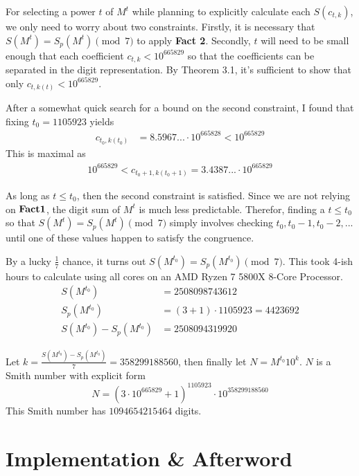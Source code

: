 \documentclass{amsart}
\newcommand{\ME}{{665829}}
\numberwithin{equation}{section}
\theoremstyle{plain} %
\theoremstyle{definition}
\theoremstyle{remark}
\begin{document}
For selecting a power $t$ of $M^t$ while planning to explicitly calculate each $S(c_{t,k})$, we only need to worry about two constraints. Firstly, it is necessary that $S(M^t) = S_p(M^t) \pmod{7}$ to apply {\bf Fact 2}. Secondly, $t$ will need to be small enough that each coefficient $c_{t,k} < 10^\ME$ so that the coefficients can be separated in the digit representation. By Theorem 3.1, it's sufficient to show that only $c_{t,k(t)} < 10^\ME$.

After a somewhat quick search for a bound on the second constraint, I found that fixing $t_0 = 1105923$ yields
\begin{align*}
c_{t_0,k(t_0)} &=          8.5967... \cdot 10 ^{665828}  < 10^{665829}
\end{align*}
This is maximal as 
\begin{align*}
10^{665829} < c_{t_0+1,k(t_0 + 1)}  =    3.4387... \cdot 10 ^{665829}
\end{align*}

As long as $t \leq t_0$, then the second constraint is satisfied. Since we are not relying on ${\bf Fact 1}$, the digit sum of $M^t$ is much less predictable. Therefor, finding a $t \leq t_0$ so that $S(M^t) = S_p(M^t) \pmod{7}$ simply involves checking $t_0, t_0 -1 , t_0 -2,...$ until one of these values happen to satisfy the congruence.

By a lucky $\frac{1}{7}$ chance, it turns out $S(M^{t_0}) =  S_p(M^{t_0}) \pmod{7}$. This took 4-ish hours to calculate using all cores on an AMD Ryzen 7 5800X 8-Core Processor.
\begin{align*}
S(M^{t_0})&=  2508098743612       \\
S_p(M^{t_0}) &= (3+ 1) \cdot  1105923 =  4423692   \\
S(M^{t_0}) -  S_p(M^{t_0}) &= 2508094319920
\end{align*}

Let $k = \frac{S(M^{t_0}) -  S_p(M^{t_0}) }{7} = 358299188560$, then finally let $N = M^{t_0} 10^k$. $N$ is a Smith number with explicit form
$$N = (3\cdot 10^\ME + 1)^{1105923} \cdot 10^{358299188560}$$
This Smith number has $\num{1094654215464}$ digits.
\,\\ \section{Implementation \& Afterword}

\end{document}
